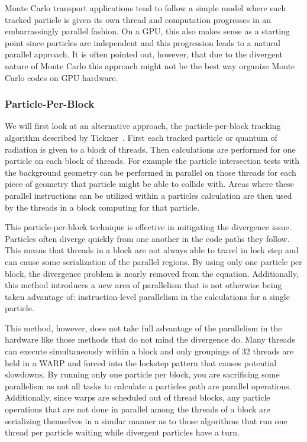 %
Monte Carlo transport applications tend to follow a simple model where each tracked particle is given its own thread and computation progresses in an embarrassingly parallel fashion. 
%
On a GPU, this also makes sense as a starting point since particles are independent and this progression leads to a natural parallel approach.
%
It is often pointed out, however, that due to the divergent nature of Monte Carlo this approach might not be the best way organize Monte Carlo codes on GPU hardware.
%

\subsubsection*{\textbf{Particle-Per-Block}}
We will first look at an alternative approach, the particle-per-block tracking algorithm described by Tickner~\cite{tickner2010monte}.
%
First each tracked particle or quantum of radiation is given to a block of threads.
%
Then calculations are performed for one particle on each block of threads.
%
For example the particle intersection tests with the background geometry can be performed in parallel on those threads for each piece of geometry that particle might be able to collide with.
%
Areas where these parallel instructions can be utilized within a particles calculation are then used by the threads in a block computing for that particle.
%

This particle-per-block technique is effective in mitigating the divergence issue.
%
Particles often diverge quickly from one another in the code paths they follow.
%
This means that threads in a block are not always able to travel in lock step and can cause some serialization of the parallel regions.
%
By using only one particle per block, the divergence problem is nearly removed from the equation.
%
Additionally, this method introduces a new area of parallelism that is not otherwise being taken advantage of: instruction-level parallelism in the calculations for a single particle.
%

%
This method, however, does not take full advantage of the parallelism in the hardware like those methods that do not mind the divergence do.
%
Many threads can execute simultaneously within a block and only groupings of 32 threads are held in a WARP and forced into the lockstep pattern that causes potential slowdowns.
%
By running only one particle per block, you are sacrificing some parallelism as not all tasks to calculate a particles path are parallel operations.
%
Additionally, since warps are scheduled out of thread blocks, any particle operations that are not done in parallel among the threads of a block are serializing themselves in a similar manner as to those algorithms that run one thread per particle waiting while divergent particles have a turn.
%

